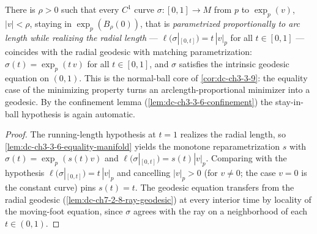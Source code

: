 \begin{lemma}
  \label{lem:dc-ch3-3-6-equality-geodesic}


  There is $\rho>0$ such that every $C^1$ curve $\sigma:[0,1]\to M$ from $p$
  to $\exp_p(v)$, $|v|<\rho$, staying in $\exp_p(B_\rho(0))$, that is
  \emph{parametrized proportionally to arc length while realizing the radial
  length} — $\ell(\sigma|_{[0,t]})=t\,|v|_p$ for all $t\in[0,1]$ — coincides
  with the radial geodesic with matching parametrization:
  $\sigma(t)=\exp_p(t\,v)$ for all $t\in[0,1]$, and $\sigma$ satisfies the
  intrinsic geodesic equation on $(0,1)$. This is the normal-ball core of
  \cref{cor:dc-ch3-3-9}: the equality case of the minimizing property turns
  an arclength-proportional minimizer into a geodesic. By the confinement
  lemma (\cref{lem:dc-ch3-3-6-confinement}) the stay-in-ball hypothesis is
  again automatic.
\end{lemma}
\begin{proof}
  \sketch

  The running-length hypothesis at $t=1$ realizes the radial length, so
  \cref{lem:dc-ch3-3-6-equality-manifold} yields the monotone
  reparametrization $s$ with $\sigma(t)=\exp_p(s(t)v)$ and
  $\ell(\sigma|_{[0,t]})=s(t)|v|_p$. Comparing with the hypothesis
  $\ell(\sigma|_{[0,t]})=t\,|v|_p$ and cancelling $|v|_p>0$ (for $v\ne0$;
  the case $v=0$ is the constant curve) pins $s(t)=t$. The geodesic equation
  transfers from the radial geodesic (\cref{lem:dc-ch7-2-8-ray-geodesic}) at
  every interior time by locality of the moving-foot equation, since
  $\sigma$ agrees with the ray on a neighborhood of each $t\in(0,1)$.

\end{proof}


